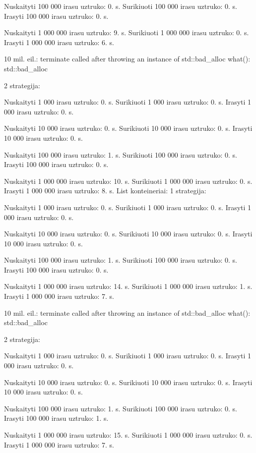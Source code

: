 Nuskaityti 100 000 irasu uztruko\+: 0. s. Surikiuoti 100 000 irasu uztruko\+: 0. s. Irasyti 100 000 irasu uztruko\+: 0. s.

Nuskaityti 1 000 000 irasu uztruko\+: 9. s. Surikiuoti 1 000 000 irasu uztruko\+: 0. s. Irasyti 1 000 000 irasu uztruko\+: 6. s.

10 mil. eil.\+: terminate called after throwing an instance of \textquotesingle{}std\+::bad\+\_\+alloc\textquotesingle{} what()\+: std\+::bad\+\_\+alloc

2 strategija\+:

Nuskaityti 1 000 irasu uztruko\+: 0. s. Surikiuoti 1 000 irasu uztruko\+: 0. s. Irasyti 1 000 irasu uztruko\+: 0. s.

Nuskaityti 10 000 irasu uztruko\+: 0. s. Surikiuoti 10 000 irasu uztruko\+: 0. s. Irasyti 10 000 irasu uztruko\+: 0. s.

Nuskaityti 100 000 irasu uztruko\+: 1. s. Surikiuoti 100 000 irasu uztruko\+: 0. s. Irasyti 100 000 irasu uztruko\+: 0. s.

Nuskaityti 1 000 000 irasu uztruko\+: 10. s. Surikiuoti 1 000 000 irasu uztruko\+: 0. s. Irasyti 1 000 000 irasu uztruko\+: 8. s. 
 List konteineriai\+: 1 strategija\+:

Nuskaityti 1 000 irasu uztruko\+: 0. s. Surikiuoti 1 000 irasu uztruko\+: 0. s. Irasyti 1 000 irasu uztruko\+: 0. s.

Nuskaityti 10 000 irasu uztruko\+: 0. s. Surikiuoti 10 000 irasu uztruko\+: 0. s. Irasyti 10 000 irasu uztruko\+: 0. s.

Nuskaityti 100 000 irasu uztruko\+: 1. s. Surikiuoti 100 000 irasu uztruko\+: 0. s. Irasyti 100 000 irasu uztruko\+: 0. s.

Nuskaityti 1 000 000 irasu uztruko\+: 14. s. Surikiuoti 1 000 000 irasu uztruko\+: 1. s. Irasyti 1 000 000 irasu uztruko\+: 7. s.

10 mil. eil.\+: terminate called after throwing an instance of \textquotesingle{}std\+::bad\+\_\+alloc\textquotesingle{} what()\+: std\+::bad\+\_\+alloc

2 strategija\+:

Nuskaityti 1 000 irasu uztruko\+: 0. s. Surikiuoti 1 000 irasu uztruko\+: 0. s. Irasyti 1 000 irasu uztruko\+: 0. s.

Nuskaityti 10 000 irasu uztruko\+: 0. s. Surikiuoti 10 000 irasu uztruko\+: 0. s. Irasyti 10 000 irasu uztruko\+: 0. s.

Nuskaityti 100 000 irasu uztruko\+: 1. s. Surikiuoti 100 000 irasu uztruko\+: 0. s. Irasyti 100 000 irasu uztruko\+: 1. s.

Nuskaityti 1 000 000 irasu uztruko\+: 15. s. Surikiuoti 1 000 000 irasu uztruko\+: 0. s. Irasyti 1 000 000 irasu uztruko\+: 7. s. 
 